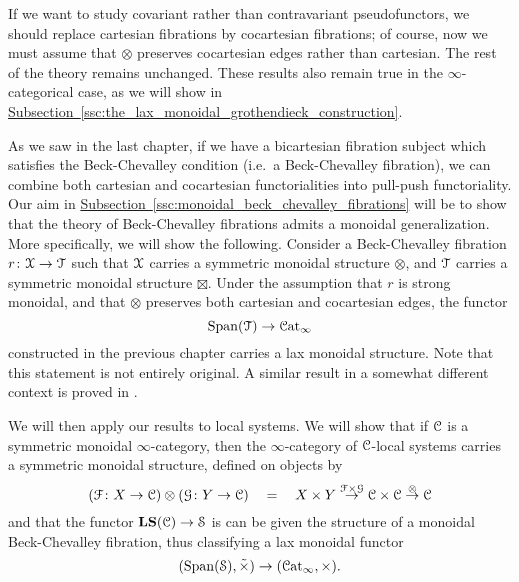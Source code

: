 \documentclass[main.tex]{subfiles}
\begin{document}
If we want to study covariant rather than contravariant pseudofunctors, we should replace cartesian fibrations by cocartesian fibrations; of course, now we must assume that $\otimes$ preserves cocartesian edges rather than cartesian. The rest of the theory remains unchanged. These results also remain true in the $\infty$-categorical case, as we will show in \hyperref[ssc:the_lax_monoidal_grothendieck_construction]{Subsection~\ref*{ssc:the_lax_monoidal_grothendieck_construction}}.

As we saw in the last chapter, if we have a bicartesian fibration subject which satisfies the Beck-Chevalley condition (i.e.\ a Beck-Chevalley fibration), we can combine both cartesian and cocartesian functorialities into pull-push functoriality. Our aim in \hyperref[ssc:monoidal_beck_chevalley_fibrations]{Subsection~\ref*{ssc:monoidal_beck_chevalley_fibrations}} will be to show that the theory of Beck-Chevalley fibrations admits a monoidal generalization. More specifically, we will show the following. Consider a Beck-Chevalley fibration $r\colon \mathcal{X} \to \mathcal{T}$ such that $\mathcal{X}$ carries a symmetric monoidal structure $\otimes$, and $\mathcal{T}$ carries a symmetric monoidal structure $\boxtimes$. Under the assumption that $r$ is strong monoidal, and that $\otimes$ preserves both cartesian and cocartesian edges, the functor
\begin{equation*}
  \mathrm{Span}(\mathcal{T}) \to \mathcal{C}\mathrm{at}_{\infty}
\end{equation*}
constructed in the previous chapter carries a lax monoidal structure. Note that this statement is not entirely original. A similar result in a somewhat different context is proved in \cite{spectralmackeyfunctors2}.

We will then apply our results to local systems. We will show that if $\mathcal{C}$ is a symmetric monoidal $\infty$-category, then the $\infty$-category of $\mathcal{C}$-local systems carries a symmetric monoidal structure, defined on objects by
\begin{equation*}
  (\mathcal{F}\colon X \to \mathcal{C}) \otimes (\mathcal{G}\colon Y \to \mathcal{C}) \quad=\quad X \times Y \overset{\mathcal{F} \times \mathcal{G}}{\to} \mathcal{C} \times \mathcal{C} \overset{\otimes}{\to} \mathcal{C}
\end{equation*}
and that the functor $\mathbf{LS}(\mathcal{C}) \to \mathcal{S}$ is can be given the structure of a monoidal Beck-Chevalley fibration, thus classifying a lax monoidal functor
\begin{equation*}
  (\mathrm{Span}(\mathcal{S}), \tilde{\times}) \to (\mathcal{C}\mathrm{at}_{\infty}, \times).
\end{equation*}
\end{document}

